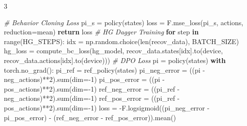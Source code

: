 \documentclass{article}
\newenvironment{Shaded}{\CodeFontSize\setlength{\topsep}{\CodeBlockSkip}\setlength{\partopsep}{0pt}}{}
\newcommand{\BuiltInTok}[1]{\textcolor[rgb]{0.00,0.50,0.00}{#1}}
\newcommand{\CommentTok}[1]{\textcolor[rgb]{0.38,0.63,0.69}{\textit{#1}}}
\newcommand{\ControlFlowTok}[1]{\textcolor[rgb]{0.00,0.44,0.13}{\textbf{#1}}}
\newcommand{\DecValTok}[1]{\textcolor[rgb]{0.25,0.63,0.44}{#1}}
\newcommand{\KeywordTok}[1]{\textcolor[rgb]{0.00,0.44,0.13}{\textbf{#1}}}
\newcommand{\NormalTok}[1]{#1}
\newcommand{\OperatorTok}[1]{\textcolor[rgb]{0.40,0.40,0.40}{#1}}
\newcommand{\StringTok}[1]{\textcolor[rgb]{0.25,0.44,0.63}{#1}}
\newcommand{\CodeFontSize}{\fontsize{4.8}{5.6}\selectfont}
\newcommand{\NumColumns}{3}  %
\newlength{\CodeBlockSkip}
\begin{document}
\begin{multicols*}{\NumColumns}
\begin{Shaded}
\begin{Highlighting}[]
\CommentTok{\# Behavior Cloning Loss}
\NormalTok{pi\_s }\OperatorTok{=}\NormalTok{ policy(states)}
\NormalTok{loss }\OperatorTok{=}\NormalTok{ F.mse\_loss(pi\_s, actions, reduction}\OperatorTok{=}\StringTok{\textquotesingle{}mean\textquotesingle{}}\NormalTok{)}
\ControlFlowTok{return}\NormalTok{ loss}
\CommentTok{\# HG Dagger Training}
\ControlFlowTok{for}\NormalTok{ step }\KeywordTok{in} \BuiltInTok{range}\NormalTok{(HG\_STEPS):}
\NormalTok{  idx }\OperatorTok{=}\NormalTok{ np.random.choice(}\BuiltInTok{len}\NormalTok{(recov\_data), BATCH\_SIZE)}
\NormalTok{  hg\_loss }\OperatorTok{=}\NormalTok{ compute\_bc\_loss(hg\_model, recov\_data.states[idx].to(device, recov\_data.actions[idx].to(device)))}
\CommentTok{\# DPO Loss}
\NormalTok{pi }\OperatorTok{=}\NormalTok{ policy(states)}
\ControlFlowTok{with}\NormalTok{ torch.no\_grad():}
\NormalTok{  pi\_ref }\OperatorTok{=}\NormalTok{ ref\_policy(states)}
\NormalTok{pi\_neg\_error }\OperatorTok{=}\NormalTok{ ((pi }\OperatorTok{{-}}\NormalTok{ neg\_actions)}\OperatorTok{**}\DecValTok{2}\NormalTok{).}\BuiltInTok{sum}\NormalTok{(dim}\OperatorTok{={-}}\DecValTok{1}\NormalTok{)}
\NormalTok{pi\_pos\_error }\OperatorTok{=}\NormalTok{ ((pi }\OperatorTok{{-}}\NormalTok{ pos\_actions)}\OperatorTok{**}\DecValTok{2}\NormalTok{).}\BuiltInTok{sum}\NormalTok{(dim}\OperatorTok{={-}}\DecValTok{1}\NormalTok{)}
\NormalTok{ref\_neg\_error }\OperatorTok{=}\NormalTok{ ((pi\_ref }\OperatorTok{{-}}\NormalTok{ neg\_actions)}\OperatorTok{**}\DecValTok{2}\NormalTok{).}\BuiltInTok{sum}\NormalTok{(dim}\OperatorTok{={-}}\DecValTok{1}\NormalTok{)}
\NormalTok{ref\_pos\_error }\OperatorTok{=}\NormalTok{ ((pi\_ref }\OperatorTok{{-}}\NormalTok{ pos\_actions)}\OperatorTok{**}\DecValTok{2}\NormalTok{).}\BuiltInTok{sum}\NormalTok{(dim}\OperatorTok{={-}}\DecValTok{1}\NormalTok{)}
\NormalTok{loss }\OperatorTok{=} \OperatorTok{{-}}\NormalTok{F.logsigmoid((pi\_neg\_error }\OperatorTok{{-}}\NormalTok{ pi\_pos\_error) }\OperatorTok{{-}}\NormalTok{ (ref\_neg\_error }\OperatorTok{{-}}\NormalTok{ ref\_pos\_error)).mean()}
\end{Highlighting}
\end{Shaded}

\end{multicols*}
\end{document}
